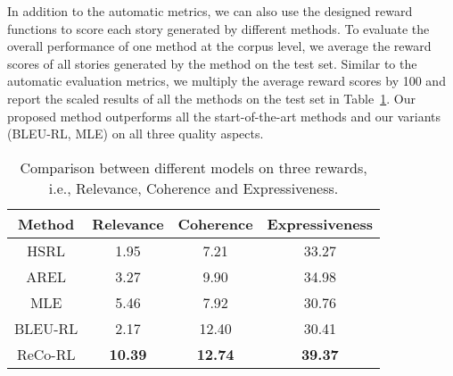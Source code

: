 \documentclass[letterpaper]{article} \usepackage{aaai20}  \usepackage{times}  \usepackage{helvet} \usepackage{courier}  \usepackage[hyphens]{url}  \usepackage{graphicx} \urlstyle{rm} \def\UrlFont{\rm}  \usepackage{graphicx}  \frenchspacing  \setlength{\pdfpagewidth}{8.5in}  \setlength{\pdfpageheight}{11in}  \usepackage{times}
\begin{document}
In addition to the automatic metrics, we can also use the designed reward functions to score each story generated by different methods. To evaluate the overall performance of one method at the corpus level, we average the reward scores of all stories generated by the method on the test set. Similar to the automatic evaluation metrics, we multiply the average reward scores by 100 and report the scaled results of all the methods on the test set in Table~\ref{tab:rewards}. Our proposed \model method outperforms all the start-of-the-art methods and our variants (BLEU-RL, MLE) on all three quality aspects.

\begin{table}[!t]
\centering
\begin{tabular}{c|ccc}
\hline
Method  & Relevance      & Coherence      & Expressiveness \\ \hline\hline
HSRL    & 1.95           & 7.21           & 33.27          \\ 
AREL    & 3.27           & 9.90           & 34.98          \\ \hline
MLE     & 5.46           & 7.92           & 30.76          \\ 
BLEU-RL & 2.17           & 12.40          & 30.41          \\ \hline
ReCo-RL & \textbf{10.39} & \textbf{12.74} & \textbf{39.37} \\ \hline
\end{tabular}\caption{Comparison between different models on three rewards, i.e., Relevance, Coherence and Expressiveness.}
\label{tab:rewards}
\end{table}
\end{document}
